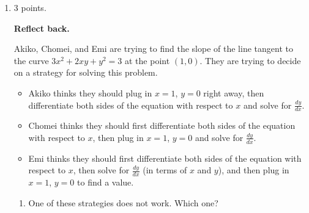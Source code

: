 \documentclass{article}
\begin{document}
\begin{enumerate}
\begin{enumerate}[resume]



  \end{enumerate}

\pspace{\newpage}

\item
\begin{grading}
3 points.
\end{grading}

 \textbf{Reflect back.}

  \begin{problem}
    Akiko, Chomei, and Emi are trying to find the slope of the line
    tangent to the curve $3x^2 + 2xy + y^2 = 3$ at the point $(1, 0)$.
    They are trying to decide on a strategy for solving this problem.
    \begin{itemize}
    \item Akiko thinks they should plug in $x = 1$, $y = 0$ right away,
      then differentiate both sides of the equation with respect to $x$ and solve for $\frac{dy}{dx}$.
    \item Chomei thinks they should first differentiate both sides of the
      equation with respect to $x$, then plug in $x = 1$, $y = 0$ and solve
      for $\frac{dy}{dx}$.
    \item Emi thinks they should first differentiate both sides of the
      equation with respect to $x$, then solve for $\frac{dy}{dx}$ (in terms
      of $x$ and $y$), and then plug in $x=1$, $y=0$ to find a value.
    \end{itemize}
  \end{problem}
    
    \begin{enumerate}
        \item
        \begin{problem}
            One of these strategies does not work. Which one?
        \end{problem}
        \pspace{\vfill}


\end{enumerate}
\end{enumerate}
\end{document}
